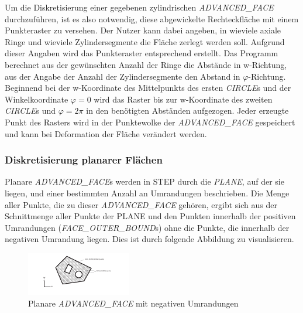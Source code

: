Um die Diskretisierung einer gegebenen zylindrischen \textit{ADVANCED\_FACE} durchzuführen, ist es also notwendig, diese abgewickelte Rechteckfläche mit einem Punkteraster zu versehen. Der Nutzer kann dabei angeben, in wieviele axiale Ringe und wieviele Zylindersegmente die Fläche zerlegt werden soll. Aufgrund dieser Angaben wird das Punkteraster entsprechend erstellt. Das Programm berechnet aus der gewünschten Anzahl der Ringe die Abstände in w-Richtung, aus der Angabe der Anzahl der Zylindersegmente den Abstand in $\varphi$-Richtung. Beginnend bei der w-Koordinate des Mittelpunkts des ersten \textit{CIRCLE}s und der Winkelkoordinate $\varphi = 0$ wird das Raster bis zur w-Koordinate des zweiten \textit{CIRCLE}s und $\varphi = 2\pi$ in den benötigten Abständen aufgezogen. Jeder erzeugte Punkt des Rasters wird in der Punktewolke der \textit{ADVANCED\_FACE} gespeichert und kann bei Deformation der Fläche verändert werden. 

\subsubsection{Diskretisierung planarer Flächen}
\label{sec:discreteplanar}

Planare \textit{ADVANCED\_FACE}s werden in STEP durch die \textit{PLANE}, auf der sie liegen, und einer bestimmten Anzahl an Umrandungen beschrieben. Die Menge aller Punkte, die zu dieser \textit{ADVANCED\_FACE} gehören, ergibt sich aus der Schnittmenge aller Punkte der PLANE und den Punkten innerhalb der positiven Umrandungen (\textit{FACE\_OUTER\_BOUND}s) ohne die Punkte, die innerhalb der negativen Umrandung liegen. 
Dies ist durch folgende Abbildung zu visualisieren.

\begin{figure}[h]
	\centering
	
	\includegraphics[width=\linewidth]{img/posnegbounds.pdf}
	
	\caption{Planare \textit{ADVANCED\_FACE} mit negativen Umrandungen}
	\label{fig:posnegbounds}
	
\end{figure}

